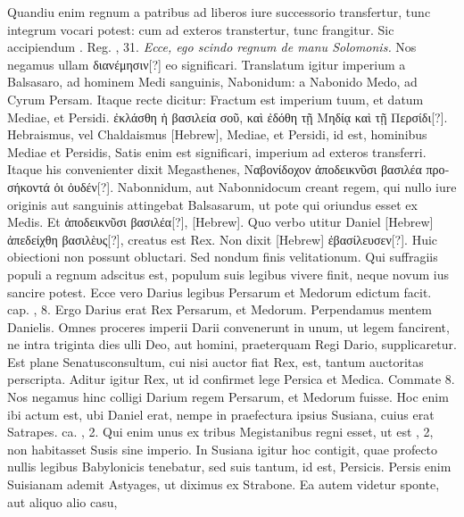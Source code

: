Quandiu enim regnum a patribus
ad liberos iure successorio transfertur, tunc integrum vocari potest:
cum ad exteros transtertur, tunc frangitur.
Sic accipiendum .
Reg. , 31.
\textit{Ecce, ego scindo regnum  de manu Solomonis.}
Nos negamus ullam \textgreek{διανέμησιν[?]} eo significari.
Translatum igitur imperium
a Balsasaro, ad hominem Medi sanguinis, Nabonidum: a Nabonido
Medo, ad Cyrum Persam.
Itaque recte dicitur: Fractum est
imperium tuum, et datum Mediae, et Persidi.
\textgreek{ἐκλάσθη ἡ βασιλεία
σοῦ, καὶ ἐδόθη τῇ Μηδίᾳ καὶ τῇ Περσίδι[?]}.
Hebraismus, vel Chaldaismus
\texthebrew{}[Hebrew], Mediae, et Persidi, id est, hominibus Mediae et Persidis,
Satis enim est significari, imperium ad exteros transferri.
Itaque his convenienter
dixit Megasthenes, \textgreek{Ναβονίδοχον ἀποδεικνῦσι βασιλέα προσήκοντά
ὁι ὀυδέν[?]}.
Nabonnidum, aut Nabonnidocum creant regem, qui
nullo iure originis aut sanguinis attingebat Balsasarum, ut pote qui
oriundus esset ex Medis.
Et \textgreek{ἀποδεικνῦσι βασιλέα[?]}, \texthebrew{}[Hebrew].
Quo verbo utitur
Daniel \texthebrew{}[Hebrew] \textgreek{ἀπεδείχθη βασιλὲυς[?]}, creatus est Rex.
Non dixit \texthebrew{}[Hebrew] \textgreek{ἐβασίλευσεν[?]}.
Huic obiectioni non possunt obluctari.
Sed nondum
finis velitationum.
Qui suffragiis populi a regnum adscitus est,
populum suis legibus vivere finit, neque novum ius sancire potest.
Ecce vero Darius legibus Persarum et Medorum edictum facit.
cap. , 8.
Ergo Darius erat Rex Persarum, et Medorum.
Perpendamus
mentem Danielis.
Omnes proceres imperii Darii convenerunt
in unum, ut legem fancirent, ne intra triginta dies ulli
Deo, aut homini, praeterquam Regi Dario, supplicaretur.
Est plane
Senatusconsultum, cui nisi auctor fiat Rex, est, tantum auctoritas
perscripta.
Aditur igitur Rex, ut id confirmet lege Persica et
Medica.
Commate 8.
Nos negamus hinc colligi Darium regem
Persarum, et Medorum fuisse.
Hoc enim ibi actum est, ubi Daniel
erat, nempe in praefectura ipsius Susiana, cuius erat Satrapes.
ca. , 2.
Qui enim unus ex tribus Megistanibus regni esset, ut est
, 2, non habitasset Susis sine imperio.
In Susiana igitur hoc contigit,
quae profecto nullis legibus Babylonicis tenebatur, sed suis
tantum, id est, Persicis.
Persis enim Suisianam ademit Astyages, ut
diximus ex Strabone.
Ea autem videtur sponte, aut aliquo alio casu,
